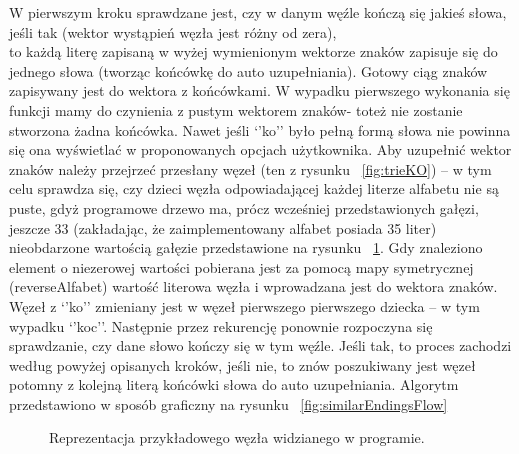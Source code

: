 \documentclass[twoside,a4paper]{book}
\begin{document}
W pierwszym kroku sprawdzane jest, czy w danym węźle kończą się  jakieś słowa, jeśli tak (wektor wystąpień węzła jest różny od zera), \\to każdą literę zapisaną w wyżej wymienionym wektorze znaków zapisuje się do jednego słowa (tworząc końcówkę do auto uzupełniania). Gotowy ciąg znaków zapisywany jest do wektora z końcówkami. W wypadku pierwszego wykonania się funkcji mamy do czynienia z pustym wektorem znaków- toteż nie zostanie stwo\-rzo\-na żadna końcówka. Nawet jeśli  ‘’ko’’ było pełną formą słowa nie powinna się ona wyświetlać w proponowanych opcjach użytkownika. Aby uzupełnić we\-ktor znaków należy przejrzeć przesłany węzeł (ten z rysunku ~\ref{fig:trieKO}) – w tym celu sprawdza się, czy dzieci węzła odpowiadającej każdej literze alfabetu nie są puste, gdyż programowe drzewo ma, prócz wcześniej przedstawionych gałęzi, jeszcze 33 (zakładając, że zaimplementowany alfabet posiada 35 liter) nieobdarzone wartością gałęzie przedstawione na rysunku ~\ref{fig:trieKOnull}. Gdy znaleziono element o niezerowej wartości pobierana jest za pomocą mapy symetrycznej (reverseAlfabet) wartość literowa węzła i wprowadzana jest do wektora znaków. Węzeł z ‘’ko’’ zmieniany jest w węzeł pierwszego pierwszego dziecka – w tym wypadku ‘’koc’’. Następnie przez rekurencję ponownie rozpoczyna się sprawdzanie, czy dane słowo kończy się w tym węźle. Jeśli tak, to proces zachodzi według powyżej opisanych kroków, jeśli nie, to znów poszukiwany jest węzeł potomny z kolejną literą końcówki słowa do auto uzupełniania. Algorytm przedstawiono w sposób graficzny na rysunku ~\ref{fig:similarEndingsFlow}
		\begin{figure}[!h]
		\centering
		\caption{Reprezentacja przykładowego węzła widzianego w programie. }
		\label{fig:trieKOnull}
		\end{figure}
\end{document}
